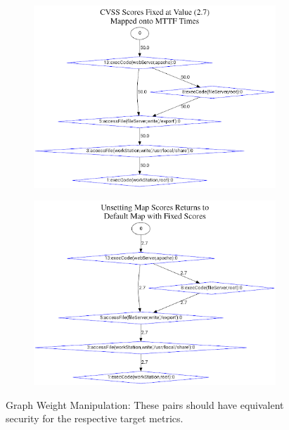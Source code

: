\begin{figure}[ht]
    \vspace{.2cm}
    \centering
    \begin{subfigure}[t]{0.48\textwidth}
        \centering
        \includegraphics[width=\linewidth]{resource/img/ch_automation/from_ares_paper/map_fixed_time.png}
        \caption{} 
        \label{fig:gm_003}
    \end{subfigure}
    \begin{subfigure}[t]{0.48\textwidth}
        \centering
        \includegraphics[width=\linewidth]{resource/img/ch_automation/from_ares_paper/map_fixed_unset.png}
        \caption{} 
        \label{fig:gm_004}
    \end{subfigure}
    \hfill
    \caption{Graph Weight Manipulation: These pairs should have equivalent security for the respective target metrics.}
    \label{fig:automation:mapGraph}
\end{figure}